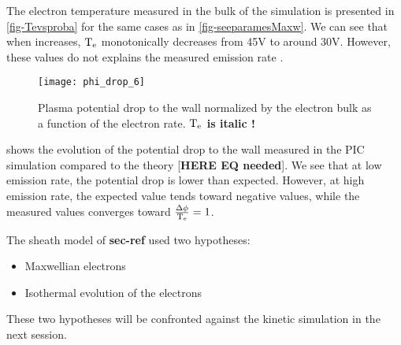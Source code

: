   The electron temperature measured in the bulk of the simulation is presented in \cref{fig-Tevsproba} for the same cases as in \cref{fig-seeparamesMaxw}.
  We can see that when \rate increases, $\mathrm{T_e}$ monotonically decreases from 45V to around 30V.
  However, these values do not explains the measured emission rate \ratepic.
  
  
  \begin{figure}[hbtp]
    \centering
    \texttt{[image: phi\_drop\_6]}
    \caption{Plasma potential drop to the wall normalized by the electron bulk as a function of the electron rate. {\bf $\mathrm{T_e}$ is italic !}}
    \label{fig-phi_rate}
  \end{figure}
  
   shows the evolution of the potential drop to the wall measured in the \ac{PIC} simulation compared to the theory [{\bf HERE EQ needed}].
  We see that at low emission rate, the potential drop is lower than expected.
  However, at high emission rate, the expected value tends toward negative values, while the measured values converges toward $\frac{\Delta \phi}{\mathrm{T_e}} = 1$.
  
  The sheath model of {\bf sec-ref } used two hypotheses:
  \begin{itemize}
    \item Maxwellian electrons
    \item Isothermal evolution of the electrons
  \end{itemize}
  These two hypotheses will be confronted against the kinetic simulation in the next session.
  
  
   